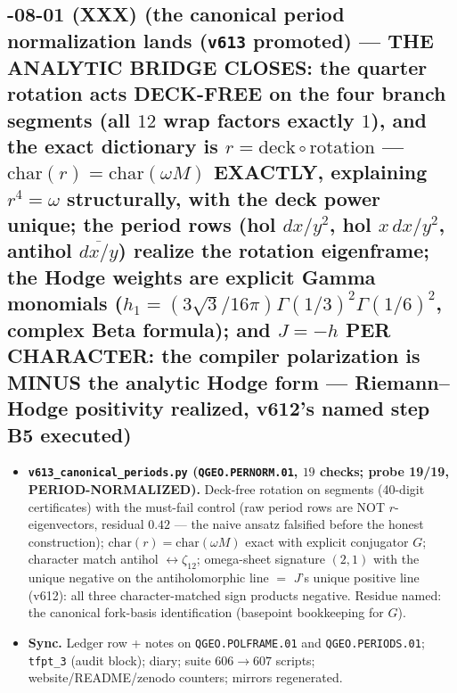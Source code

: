 \subsection*{-08-01 (XXX) (the canonical period normalization lands (\texttt{v613} promoted) --- THE ANALYTIC BRIDGE CLOSES: the quarter rotation acts DECK-FREE on the four branch segments (all $12$ wrap factors exactly $1$), and the exact dictionary is $r=\mathrm{deck}\circ\mathrm{rotation}$ --- $\mathrm{char}(r)=\mathrm{char}(\omega M)$ EXACTLY, explaining $r^4=\omega$ structurally, with the deck power unique; the period rows (hol $dx/y^2$, hol $x\,dx/y^2$, antihol $\overline{dx/y}$) realize the rotation eigenframe; the Hodge weights are explicit Gamma monomials ($h_1=(3\sqrt3/16\pi)\Gamma(1/3)^2\Gamma(1/6)^2$, complex Beta formula); and $J=-h$ PER CHARACTER: the compiler polarization is MINUS the analytic Hodge form --- Riemann--Hodge positivity realized, v612's named step B5 executed)}
\begin{itemize}[leftmargin=1.5em]
\item \textbf{\texttt{v613\_canonical\_periods.py} (\texttt{QGEO.PERNORM.01}, $19$ checks;
probe 19/19, PERIOD-NORMALIZED).} Deck-free rotation on segments (40-digit certificates)
with the must-fail control (raw period rows are NOT $r$-eigenvectors, residual $0.42$ ---
the naive ansatz falsified before the honest construction); $\mathrm{char}(r)=
\mathrm{char}(\omega M)$ exact with explicit conjugator $G$; character match antihol
$\leftrightarrow\zeta_{12}$; omega-sheet signature $(2,1)$ with the unique negative on the
antiholomorphic line $=$ $J$'s unique positive line (v612): all three character-matched
sign products negative.  Residue named: the canonical fork-basis identification
(basepoint bookkeeping for $G$).
\item \textbf{Sync.} Ledger row + notes on \texttt{QGEO.POLFRAME.01} and
\texttt{QGEO.PERIODS.01}; \texttt{tfpt\_3} (audit block); diary; suite $606\to607$
scripts; website/README/zenodo counters; mirrors regenerated.
\end{itemize}

